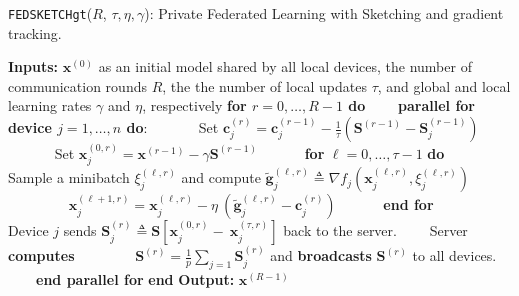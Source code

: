 \begin{algorithm}[H]
\caption{\texttt{FEDSKETCHgt}($R$, $\tau, \eta, \gamma$): Private Federated Learning with Sketching and gradient tracking. }\label{Alg:PFLHet}
\begin{algorithmic}[1]
\State \textbf{Inputs:} $\boldsymbol{x}^{(0)}$ as an initial  model shared by all local devices, the number of communication rounds $R$, the the number of local updates $\tau$, and global and local learning rates $\gamma$ and $\eta$, respectively
\State \textbf{for $r=0, \ldots, R-1$ do}
\State $\qquad$\textbf{parallel for device $j=1,\ldots,n$ do}:
\State $\qquad\quad$ Set $\mathbf{c}_j^{(r)}=\mathbf{c}_j^{(r-1)}-\frac{1}{\tau}\left(\mathbf{S}^{(r-1)}-\mathbf{S}^{(r-1)}_j\right)$
\State $\qquad\quad$ Set $\boldsymbol{x}_j^{(0,r)}=\boldsymbol{x}^{(r-1)}-\gamma{\mathbf{S}}^{(r-1)}$ 
\State $\qquad\quad $\textbf{for} $\ell=0,\ldots,\tau-1$ \textbf{do}
\State $\qquad\quad\quad$ Sample a minibatch $\xi_j^{(\ell,r)}$ and compute $\tilde{\mathbf{g}}_{j}^{(\ell,r)}\triangleq\nabla{f}_j(\boldsymbol{x}^{(\ell,r)}_j,\xi_j^{(\ell,r)})$
\State $\qquad\quad\quad$ $\boldsymbol{x}^{(\ell+1,r)}_{j}=\boldsymbol{x}^{(\ell,r)}_j-\eta~\left( \tilde{\mathbf{g}}_{j}^{(\ell,r)}-\mathbf{c}_j^{(r)}\right)$ \label{eq:update-rule-alg}
\State $\qquad\quad$\textbf{end for}
\State $\qquad\quad\quad$Device $j$ sends $\mathbf{S}^{(r)}_j\triangleq\mathbf{S}\left[\boldsymbol{x}_j^{(0,r)}-~{\boldsymbol{x}}_{j}^{(\tau,r)}\right]$ back to the server.
\State $\qquad$Server \textbf{computes} 
\State $\qquad\qquad {\mathbf{S}}^{(r)}=\frac{1}{p}\sum_{j=1}\mathbf{S}^{(r)}_j$ and  \textbf{broadcasts} $\mathbf{S}^{(r)}$ to all devices.
\State $\qquad$\textbf{end parallel for}
\State \textbf{end}
\State \textbf{Output:} ${\boldsymbol{x}}^{(R-1)}$
\vspace{- 0.1cm}
\end{algorithmic}
\end{algorithm}




